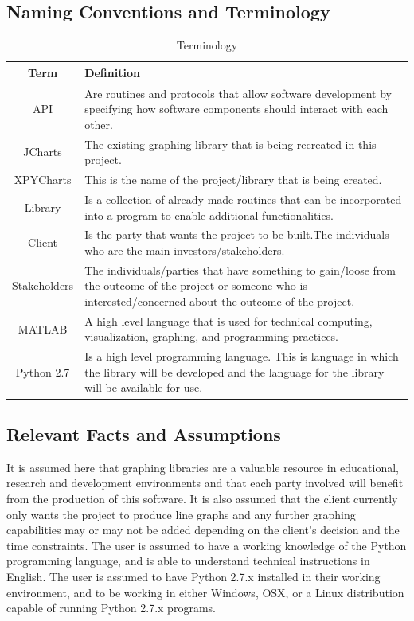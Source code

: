 \documentclass[12pt, titlepage]{article}
\begin{document}
\subsection{Naming Conventions and Terminology}
\begin{center}
\begin{table}[!hpb]
    \caption{Terminology} 
    \begin{tabular}{ |c|p{11cm}|}
	\hline
	Term & Definition\\ \hline
	API & Are routines and protocols that allow software development by specifying how software components should interact with each other.  \\ \hline
	JCharts & The existing graphing library that is being recreated in this project.\\ \hline
	XPYCharts & This is the name of the project/library that is being created.\\ \hline
	Library & Is a collection of already made routines that can be incorporated into a program to enable additional functionalities.\\ \hline
	Client & Is the party that wants the project to be built.The individuals who are the main investors/stakeholders.\\ \hline
	Stakeholders & The individuals/parties that have something to gain/loose from the outcome of the project or someone who is interested/concerned about the outcome of the project.\\ \hline
	MATLAB & A high level language that is used for technical computing, visualization, graphing, and programming practices.\\ \hline
	Python 2.7 & Is a high level programming language. This is language in which the library will be developed and the language for the library will be available for use.\\ \hline
    \end{tabular}
\end{table}
\end{center}
\subsection{Relevant Facts and Assumptions}
It is assumed here that graphing libraries are a valuable resource in educational, research and development environments and that each party involved will benefit from the production of this software. It is also assumed that the client currently only wants the project to produce line graphs and any further graphing capabilities may or may not be added depending on the client's decision and the time constraints.
The user is assumed to have a working knowledge of the Python programming language, and is able to understand technical instructions in English. The user is assumed to have Python 2.7.x installed in their working environment, and to be working in either Windows, OSX, or a Linux distribution capable of running Python 2.7.x programs.
\clearpage
\end{document}
